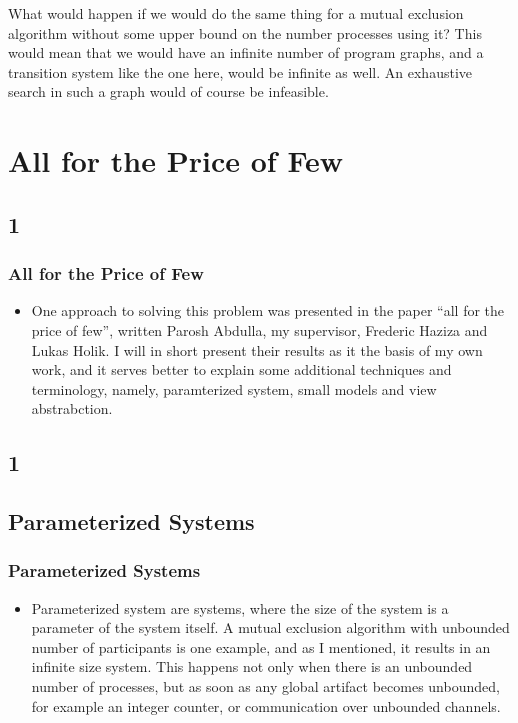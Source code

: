 \documentclass[handout]{beamer}
\begin{document}
\begin{footnotesize}
\begin{frame}
What would happen if we would do the same thing for a mutual exclusion algorithm without some upper bound on the number processes using it? This would mean that we would have an infinite number of program graphs, and a transition system like the one here, would be infinite as well. An exhaustive search in such a graph would of course be infeasible.
\end{frame}


\section{All for the Price of Few}
\subsection*{1}
\begin{frame}
  \frametitle{All for the Price of Few}
  \begin{itemize}
\item
One approach to solving this problem was presented in the paper ``all for the price of few'', written Parosh Abdulla, my supervisor, Frederic Haziza and Lukas Holik. I will in short present their results as it the basis of my own work, and it serves better to explain some additional techniques and terminology, namely,  paramterized system, small models and view abstrabction.

  \end{itemize}
\end{frame}

\subsection*{1}
\subsection{Parameterized Systems}
\begin{frame}
  \frametitle{Parameterized Systems}
  \begin{itemize}
  \item
  Parameterized system are systems, where the size of the system is a parameter of the system itself. A mutual exclusion algorithm with unbounded number of participants is one example, and as I mentioned, it results in an infinite size system. This happens not only when there is an unbounded number of processes, but as soon as any global artifact becomes unbounded, for example an integer counter, or communication over unbounded channels.


\end{itemize}
\end{frame}
\end{footnotesize}
\end{document}
